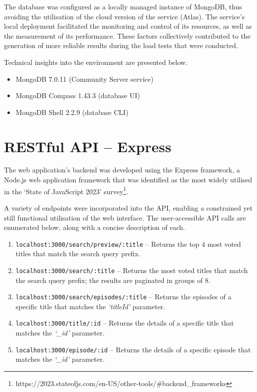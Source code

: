 The database was configured as a locally managed instance of MongoDB, thus avoiding the utilisation of the cloud version of the service (Atlas).
The service's local deployment facilitated the monitoring and control of its resources, as well as the measurement of its performance.
These factors collectively contributed to the generation of more reliable results during the load tests that were conducted.

Technical insights into the environment are presented below.

\begin{itemize}
	\item MongoDB 7.0.11 (Community Server service)
	\item MongoDB Compass 1.43.3 (database UI)
	\item MongoDB Shell 2.2.9 (database CLI)
\end{itemize}

\section{RESTful API -- Express}

The web application's backend was developed using the Express framework, a Node.js web application framework that was identified as the most widely utilised in the `State of JavaScript 2023' survey\footnote[3]{https://2023.stateofjs.com/en-US/other-tools/\#backend\_frameworks}.

A variety of endpoints were incorporated into the API, enabling a constrained yet still functional utilisation of the web interface.
The user-accessible API calls are enumerated below, along with a concise description of each.

\begin{enumerate}
	\item \verb|localhost:3000/search/preview/:title| -- Returns the top 4 most voted titles that match the search query prefix.
	\item \verb|localhost:3000/search/:title| -- Returns the most voted titles that match the search query prefix; the results are paginated in groups of 8.
	\item \verb|localhost:3000/search/episodes/:title| -- Returns the episodes of a specific title that matches the \textit{`titleId'} parameter.
	\item \verb|localhost:3000/title/:id| -- Returns the details of a specific title that matches the \textit{`\_id'} parameter.
	\item \verb|localhost:3000/episode/:id| -- Returns the details of a specific episode that matches the \textit{`\_id'} parameter.
\end{enumerate}

